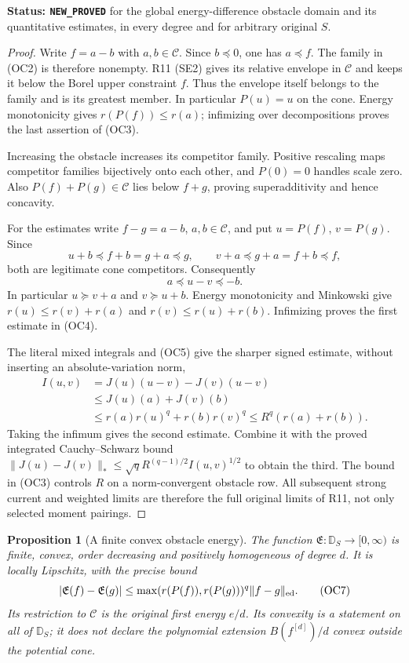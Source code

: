 \documentclass[11pt,a4paper]{article}
\numberwithin{equation}{section}
\newtheorem{proposition}[theorem]{Proposition}
\theoremstyle{definition}
\theoremstyle{remark}
\begin{document}
\noindent\textbf{Status: \texttt{NEW\_PROVED}} for the
global energy-difference obstacle domain and its quantitative
estimates, in every degree and for arbitrary original $S$.

\begin{proof}
Write $f=a-b$ with $a,b\in\mathscr C$.  Since $b\preceq0$,
one has $a\preceq f$.  The family in \textup{(OC2)} is therefore
nonempty.  R11 \textup{(SE2)} gives its relative envelope in
$\mathscr C$ and keeps it below the Borel upper constraint $f$.
Thus the envelope itself belongs to the family and is its
greatest member.  In particular $P(u)=u$ on the cone.
Energy monotonicity gives $r(P(f))\le r(a)$; infimizing over
decompositions proves the last assertion of \textup{(OC3)}.

Increasing the obstacle increases its competitor family.
Positive rescaling maps competitor families bijectively onto
each other, and $P(0)=0$ handles scale zero.  Also
$P(f)+P(g)\in\mathscr C$ lies below $f+g$, proving
superadditivity and hence concavity.

For the estimates write $f-g=a-b$, $a,b\in\mathscr C$, and
put $u=P(f)$, $v=P(g)$.  Since
\[
 u+b\preceq f+b=g+a\preceq g,\qquad
 v+a\preceq g+a=f+b\preceq f,
\]
both are legitimate cone competitors.  Consequently
\[
                        a\preceq u-v\preceq-b.
 \tag{OC5}
\]
In particular $u\succeq v+a$ and $v\succeq u+b$.
Energy monotonicity and Minkowski give
$r(u)\le r(v)+r(a)$ and $r(v)\le r(u)+r(b)$.
Infimizing proves the first estimate in \textup{(OC4)}.

The literal mixed integrals and \textup{(OC5)} give the sharper
signed estimate, without inserting an absolute-variation norm,
\[
 \begin{split}
 I(u,v)&=J(u)(u-v)-J(v)(u-v)\\
       &\le J(u)(a)+J(v)(b)\\
       &\le r(a)r(u)^q+r(b)r(v)^q
        \le R^q(r(a)+r(b)).
 \end{split}
 \tag{OC6}
\]
Taking the infimum gives the second estimate.  Combine it with
the proved integrated Cauchy--Schwarz bound
$\|J(u)-J(v)\|_*\le\sqrt q R^{(q-1)/2}I(u,v)^{1/2}$
to obtain the third.  The bound in \textup{(OC3)} controls
$R$ on a norm-convergent obstacle row.  All subsequent
strong current and weighted limits are therefore the full
original limits of R11, not only selected moment pairings.
\end{proof}

\begin{proposition}[A finite convex obstacle energy]
\label{prop:r12-convex-obstacle-energy}
The function $\mathfrak E:\mathbb D_S\to[0,\infty)$ is
finite, convex, order decreasing and positively homogeneous
of degree $d$.  It is locally Lipschitz, with the precise bound
\[
       |\mathfrak E(f)-\mathfrak E(g)|
           \le\max(r(P(f)),r(P(g)))^q\|f-g\|_{\rm ed}.
 \tag{OC7}
\]
Its restriction to $\mathscr C$ is the original first energy
$e/d$.  Its convexity is a statement on all of $\mathbb D_S$;
it does not declare the polynomial extension $B(f^{[d]})/d$
convex outside the potential cone.
\end{proposition}
\end{document}
